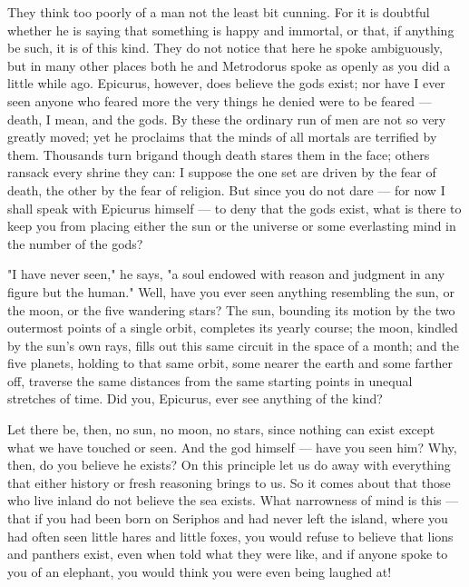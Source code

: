  They think too poorly of a man not the least bit cunning. For it is doubtful whether he is saying that something is happy and immortal, or that, if anything be such, it is of this kind. They do not notice that here he spoke ambiguously, but in many other places both he and Metrodorus spoke as openly as you did a little while ago. Epicurus, however, does believe the gods exist; nor have I ever seen anyone who feared more the very things he denied were to be feared — death, I mean, and the gods. By these the ordinary run of men are not so very greatly moved; yet he proclaims that the minds of all mortals are terrified by them. Thousands turn brigand though death stares them in the face; others ransack every shrine they can: I suppose the one set are driven by the fear of death, the other by the fear of religion. But since you do not dare — for now I shall speak with Epicurus himself — to deny that the gods exist, what is there to keep you from placing either the sun or the universe or some everlasting mind in the number of the gods?

 "I have never seen," he says, "a soul endowed with reason and judgment in any figure but the human." Well, have you ever seen anything resembling the sun, or the moon, or the five wandering stars? The sun, bounding its motion by the two outermost points of a single orbit, completes its yearly course; the moon, kindled by the sun's own rays, fills out this same circuit in the space of a month; and the five planets, holding to that same orbit, some nearer the earth and some farther off, traverse the same distances from the same starting points in unequal stretches of time. Did you, Epicurus, ever see anything of the kind?

 Let there be, then, no sun, no moon, no stars, since nothing can exist except what we have touched or seen. And the god himself — have you seen him? Why, then, do you believe he exists? On this principle let us do away with everything that either history or fresh reasoning brings to us. So it comes about that those who live inland do not believe the sea exists. What narrowness of mind is this — that if you had been born on Seriphos and had never left the island, where you had often seen little hares and little foxes, you would refuse to believe that lions and panthers exist, even when told what they were like, and if anyone spoke to you of an elephant, you would think you were even being laughed at!

